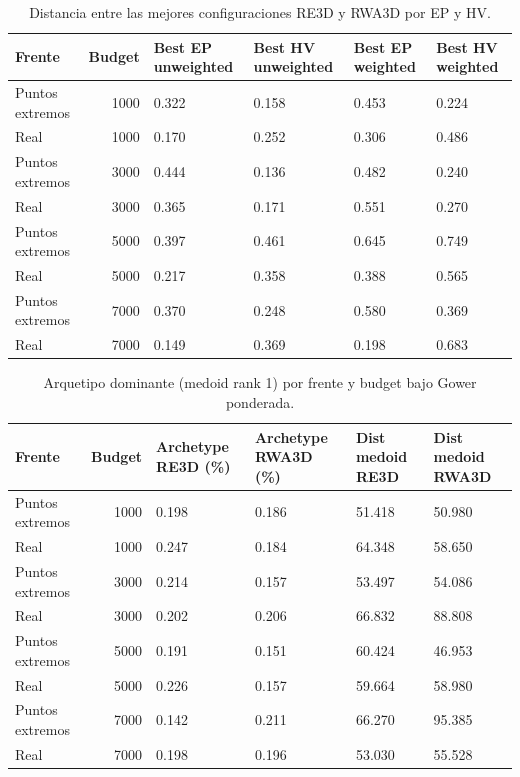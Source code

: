 \documentclass[11pt,a4paper]{article}
\begin{document}
{\scriptsize
\begin{table}[p]
\centering
\caption{Distancia entre las mejores configuraciones RE3D y RWA3D por EP y HV.}
\label{tab:configuration_distance_best}
\begin{tabular}{lrllll}
\toprule
Frente & Budget & Best EP unweighted & Best HV unweighted & Best EP weighted & Best HV weighted \\
\midrule
Puntos extremos & 1000 & 0.322 & 0.158 & 0.453 & 0.224 \\
Real & 1000 & 0.170 & 0.252 & 0.306 & 0.486 \\
Puntos extremos & 3000 & 0.444 & 0.136 & 0.482 & 0.240 \\
Real & 3000 & 0.365 & 0.171 & 0.551 & 0.270 \\
Puntos extremos & 5000 & 0.397 & 0.461 & 0.645 & 0.749 \\
Real & 5000 & 0.217 & 0.358 & 0.388 & 0.565 \\
Puntos extremos & 7000 & 0.370 & 0.248 & 0.580 & 0.369 \\
Real & 7000 & 0.149 & 0.369 & 0.198 & 0.683 \\
\bottomrule
\end{tabular}
\end{table}

}

{\scriptsize
\begin{table}[p]
\centering
\caption{Arquetipo dominante (medoid rank 1) por frente y budget bajo Gower ponderada.}
\label{tab:configuration_distance_medoids}
\begin{tabular}{lrllll}
\toprule
Frente & Budget & Archetype RE3D (\%) & Archetype RWA3D (\%) & Dist medoid RE3D & Dist medoid RWA3D \\
\midrule
Puntos extremos & 1000 & 0.198 & 0.186 & 51.418 & 50.980 \\
Real & 1000 & 0.247 & 0.184 & 64.348 & 58.650 \\
Puntos extremos & 3000 & 0.214 & 0.157 & 53.497 & 54.086 \\
Real & 3000 & 0.202 & 0.206 & 66.832 & 88.808 \\
Puntos extremos & 5000 & 0.191 & 0.151 & 60.424 & 46.953 \\
Real & 5000 & 0.226 & 0.157 & 59.664 & 58.980 \\
Puntos extremos & 7000 & 0.142 & 0.211 & 66.270 & 95.385 \\
Real & 7000 & 0.198 & 0.196 & 53.030 & 55.528 \\
\bottomrule
\end{tabular}
\end{table}

}
\end{document}
